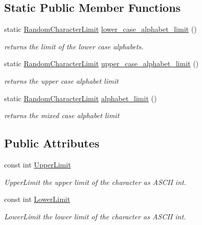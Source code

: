 \subsection*{Static Public Member Functions}
\begin{DoxyCompactItemize}
\item 
static \hyperlink{classtestcaser_1_1maker_1_1RandomCharacterLimit}{Random\+Character\+Limit} \hyperlink{classtestcaser_1_1maker_1_1RandomCharacterLimit_ae6e40c00b9225a88b0133c17d4b24f90}{lower\+\_\+case\+\_\+alphabet\+\_\+limit} ()
\begin{DoxyCompactList}\small\item\em returns the limit of the lower case alphabets. \end{DoxyCompactList}\item 
static \hyperlink{classtestcaser_1_1maker_1_1RandomCharacterLimit}{Random\+Character\+Limit} \hyperlink{classtestcaser_1_1maker_1_1RandomCharacterLimit_a7a0ee0690e97a27402faca09c6044aed}{upper\+\_\+case\+\_\+alphabet\+\_\+limit} ()
\begin{DoxyCompactList}\small\item\em returns the upper case alphabet limit \end{DoxyCompactList}\item 
static \hyperlink{classtestcaser_1_1maker_1_1RandomCharacterLimit}{Random\+Character\+Limit} \hyperlink{classtestcaser_1_1maker_1_1RandomCharacterLimit_a4519263daf2737941039054c60c26ca5}{alphabet\+\_\+limit} ()
\begin{DoxyCompactList}\small\item\em returns the mixed case alphabet limit \end{DoxyCompactList}\end{DoxyCompactItemize}
\subsection*{Public Attributes}
\begin{DoxyCompactItemize}
\item 
\mbox{\label{classtestcaser_1_1maker_1_1RandomCharacterLimit_adf6f29860db063472c941a169b918667}} 
const int \hyperlink{classtestcaser_1_1maker_1_1RandomCharacterLimit_adf6f29860db063472c941a169b918667}{Upper\+Limit}
\begin{DoxyCompactList}\small\item\em Upper\+Limit the upper limit of the character as A\+S\+C\+II int. \end{DoxyCompactList}\item 
\mbox{\label{classtestcaser_1_1maker_1_1RandomCharacterLimit_a152f8b1958ceec1128967cefa40891d9}} 
const int \hyperlink{classtestcaser_1_1maker_1_1RandomCharacterLimit_a152f8b1958ceec1128967cefa40891d9}{Lower\+Limit}
\begin{DoxyCompactList}\small\item\em Lower\+Limit the lower limit of the character as A\+S\+C\+II int. \end{DoxyCompactList}\end{DoxyCompactItemize}


